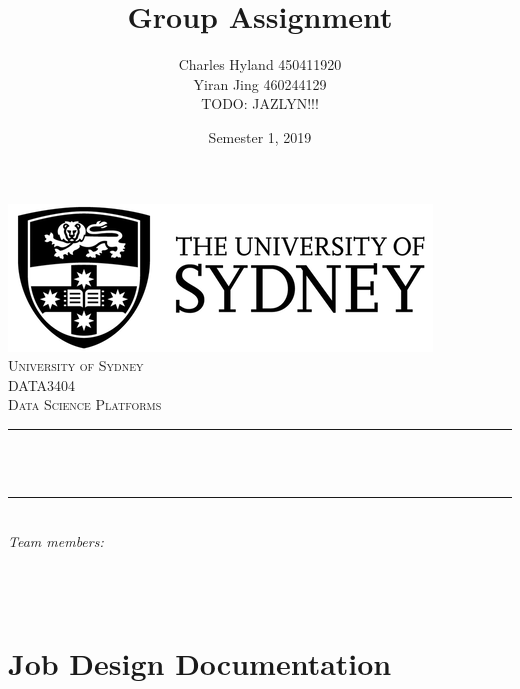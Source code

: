 \documentclass[12pt]{article}
\title{Group Assignment}                                %
\author{
    Charles Hyland 450411920 \\
    Yiran Jing 460244129 \\
    TODO: JAZLYN!!!
}                               %
\date{Semester 1, 2019}                                         %
\makeatletter
\let\thetitle\@title
\let\theauthor\@author
\let\thedate\@date
\makeatother
\begin{document}

\begin{titlepage}
    \centering
    \vspace*{0.5 cm}
    \includegraphics[scale = 0.75]{USYD_LOGO_New.jpg}\\[1.0 cm] %
    \textsc{\LARGE University of Sydney}\\[2.0 cm]  %
    \textsc{\Large DATA3404}\\[0.5 cm]              %
    \textsc{\large Data Science Platforms}\\[0.5 cm]                %
    \rule{\linewidth}{0.2 mm} \\[0.4 cm]
    { \huge \bfseries \thetitle}\\
    \rule{\linewidth}{0.2 mm} \\[1.5 cm]
    
    
        
    \emph{Team members:}\\
    \theauthor
        
    \begin{minipage}{0.45\textwidth}
            
    \end{minipage}\\[2 cm]
    
    {\large \thedate}\\[2 cm]
 
    \vfill
    
\end{titlepage}


\tableofcontents
\pagebreak


{}
\section*{Job Design Documentation}
\end{document}
